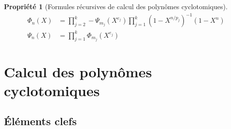 \documentclass{article}
\theoremstyle{break}                  %
\newtheorem{propriete}{Propriété}
\begin{document}
\begin{propriete}[Formules récursives de calcul des polynômes cyclotomiques]
	\begin{align*}
		\Phi_n(X) &=\prod_{j=2}^{k} - \Psi_{m_j}(X^{e_j}) \prod_{j=1}^{k} (1-X^{n/p_j})^{-1}(1-X^n)\tag{3.17}\label{recurphi}\\
		\Psi_{n}(X) &=\prod_{j=1}^{k} \Phi_{m_j}(X^{e_j})\tag{3.25}\label{recurpsi}
	\end{align*}
\end{propriete}

\section*{Calcul des polynômes cyclotomiques}
\subsection*{Éléments clefs}
\end{document}
